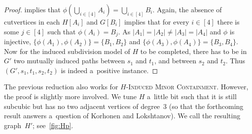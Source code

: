 \documentclass[a4paper,UKenglish,cleveref,autoref]{lipics-v2021}
\begin{document}
\begin{proof}
   implies that $\phi(\bigcup_{i \in [4]} A_i) = \bigcup_{i \in [4]} B_i$.
  Again, the absence of cutvertices in each $H[A_i]$ and $G[B_i]$ implies that for every $i \in [4]$ there is some $j \in [4]$ such that $\phi(A_i)=B_j$.
  As $|A_1| = |A_2| \neq |A_3| = |A_4|$ and $\phi$ is injective, $\{\phi(A_1), \phi(A_2)\}=\{B_1,B_2\}$ and $\{\phi(A_3), \phi(A_4)\}=\{B_3,B_4\}$.
  Now for the induced subdivision model of $H$ to be completed, there has to be in $G'$ two mutually induced paths between $s_1$ and $t_1$, and between $s_2$ and $t_2$.
  Thus $(G', s_1, t_1, s_2, t_2)$ is indeed a~positive instance.
\end{proof}

The previous reduction also works for \textsc{$H$-Induced Minor Containment}.
However, the proof is slightly more involved.
We tune $H$ a~little bit such that it is still subcubic but has no two adjacent vertices of degree~3 (so that the forthcoming result answers a~question of Korhonen and Lokshtanov).
We call the resulting graph~$H'$; see~\cref{fig:Hp}.
\end{document}
